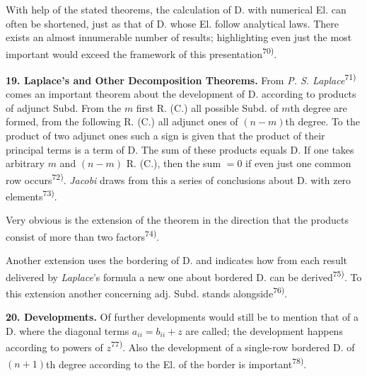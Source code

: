 \thispagestyle{fancy}

\vspace{0.5cm}

With help of the stated theorems, the calculation of D. with numerical El. can often be shortened, just as that of D. whose El. follow analytical laws. There exists an almost innumerable number of results; highlighting even just the most important would exceed the framework of this presentation\textsuperscript{70)}.

\vspace{0.2cm}

\textbf{19. Laplace's and Other Decomposition Theorems.} From \textit{P. S. Laplace}\textsuperscript{71)} comes an important theorem about the development of D. according to products of adjunct Subd. From the $m$ first R. (C.) all possible Subd. of $m$th degree are formed, from the following R. (C.) all adjunct ones of $(n-m)$th degree. To the product of two adjunct ones such a sign is given that the product of their principal terms is a term of D. The sum of these products equals D. If one takes arbitrary $m$ and $(n-m)$ R. (C.), then the sum $=0$ if even just one common row occurs\textsuperscript{72)}. \textit{Jacobi} draws from this a series of conclusions about D. with zero elements\textsuperscript{73)}.

Very obvious is the extension of the theorem in the direction that the products consist of more than two factors\textsuperscript{74)}.

Another extension uses the bordering of D. and indicates how from each result delivered by \textit{Laplace}'s formula a new one about bordered D. can be derived\textsuperscript{75)}. To this extension another concerning adj. Subd. stands alongside\textsuperscript{76)}.

\vspace{0.2cm}

\textbf{20. Developments.} Of further developments would still be to mention that of a D. where the diagonal terms $a_{ii}=b_{ii}+z$ are called; the development happens according to powers of $z$\textsuperscript{77)}. Also the development of a single-row bordered D. of $(n+1)$th degree according to the El. of the border is important\textsuperscript{78)}.

